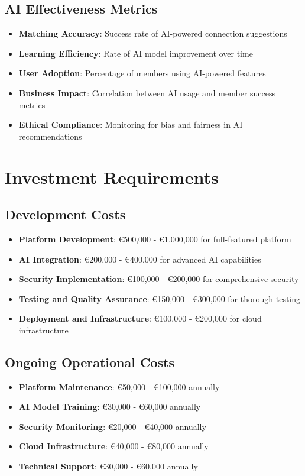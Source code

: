 \subsection{AI Effectiveness Metrics}
\begin{itemize}
    \item \textbf{Matching Accuracy}: Success rate of AI-powered connection suggestions
    \item \textbf{Learning Efficiency}: Rate of AI model improvement over time
    \item \textbf{User Adoption}: Percentage of members using AI-powered features
    \item \textbf{Business Impact}: Correlation between AI usage and member success metrics
    \item \textbf{Ethical Compliance}: Monitoring for bias and fairness in AI recommendations
\end{itemize}

\section{Investment Requirements}

\subsection{Development Costs}
\begin{itemize}
    \item \textbf{Platform Development}: €500,000 - €1,000,000 for full-featured platform
    \item \textbf{AI Integration}: €200,000 - €400,000 for advanced AI capabilities
    \item \textbf{Security Implementation}: €100,000 - €200,000 for comprehensive security
    \item \textbf{Testing and Quality Assurance}: €150,000 - €300,000 for thorough testing
    \item \textbf{Deployment and Infrastructure}: €100,000 - €200,000 for cloud infrastructure
\end{itemize}
\subsection{Ongoing Operational Costs}
\begin{itemize}
    \item \textbf{Platform Maintenance}: €50,000 - €100,000 annually
    \item \textbf{AI Model Training}: €30,000 - €60,000 annually
    \item \textbf{Security Monitoring}: €20,000 - €40,000 annually
    \item \textbf{Cloud Infrastructure}: €40,000 - €80,000 annually
    \item \textbf{Technical Support}: €30,000 - €60,000 annually
\end{itemize}


